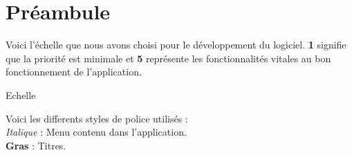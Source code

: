 \section*{Pr{\'e}ambule}

Voici l'{\'e}chelle que nous avons choisi pour le d{\'e}veloppement du
logiciel.
{\bf 1} signifie que la priorit{\'e} est minimale et {\bf 5} repr{\'e}sente
les fonctionnalit{\'e}s vitales au bon fonctionnement de l'application.
\begin{center}
\par Echelle\\
\end{center}

\par Voici les differents styles de police utilis{\'e}s : \\
{\it Italique}  : Menu contenu dans l'application.\\
{\bf Gras} 	: Titres.\\
